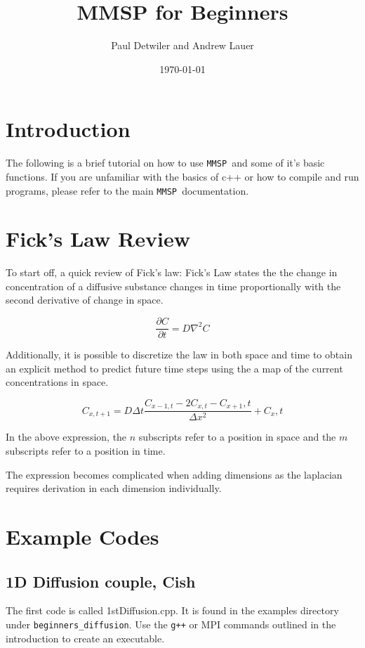 \documentclass{article}
\title{MMSP for Beginners}
\author{Paul Detwiler and Andrew Lauer}
\date{\today}
\def\MMSP{{\tt MMSP\ }}
\begin{document}
\maketitle
\section{Introduction}
The following is a brief tutorial on how to use \MMSP and some of it's basic functions. If you are unfamiliar with the basics of c++ or how to compile and run programs, please refer to the main \MMSP documentation.

\section{Fick's Law Review}

To start off, a quick review of Fick’s law:  Fick’s Law states the the change in concentration of a diffusive substance changes in time proportionally with the second derivative of change in space.

$$\frac{\partial C}{\partial t}=D\nabla ^2C$$

Additionally, it is possible to discretize the law in both space and time to obtain an explicit method to predict future time steps using the a map of the current concentrations in space. 

$$C_{x,t+1} = D\Delta t\frac{C_{x-1,t} - 2C_{x,t} - C_{x+1},t }{ \Delta x^2} + C_x,t $$

In the above expression, the $n$ subscripts refer to a position in space and the $m$ subscripts refer to a position in time.

The expression becomes complicated when adding dimensions as the laplacian requires derivation in each dimension individually.   


\section{Example Codes}
\label{sec:examples}

\subsection{1D Diffusion couple, Cish}

The first code is called 1stDiffusion.cpp.  It is found in the examples directory under {\tt beginners\_diffusion}. Use the {\tt g++} or MPI commands outlined in the introduction to create an executable.
\end{document}
